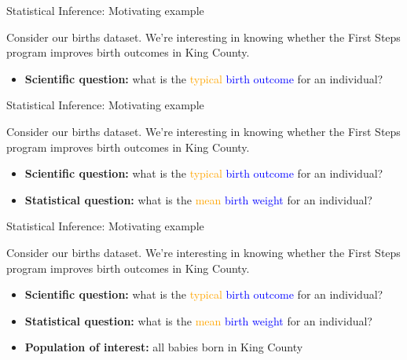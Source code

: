 \documentclass[10pt,t]{beamer}
\begin{document}
\begin{frame}{Statistical Inference: Motivating example}

Consider our births dataset. We're interesting in knowing whether the First Steps program improves birth outcomes in King County.

\vspace{0.1cm}

\begin{itemize}
	\item \textbf{Scientific question:} what is the \textcolor{orange}{typical}  \textcolor{blue}{birth outcome} for an individual?

\end{itemize}

\end{frame}

\begin{frame}{Statistical Inference: Motivating example}

Consider our births dataset. We're interesting in knowing whether the First Steps program improves birth outcomes in King County.

\vspace{0.1cm}

\begin{itemize}
	\item \textbf{Scientific question:} what is the \textcolor{orange}{typical}  \textcolor{blue}{birth outcome} for an individual?
	\item \textbf{Statistical question:} what is the \textcolor{orange}{mean} \textcolor{blue}{birth weight} for an individual?
\end{itemize}

\end{frame}

\begin{frame}{Statistical Inference: Motivating example}

Consider our births dataset. We're interesting in knowing whether the First Steps program improves birth outcomes in King County.

\vspace{0.1cm}

\begin{itemize}
	\item \textbf{Scientific question:} what is the \textcolor{orange}{typical}  \textcolor{blue}{birth outcome} for an individual?
	\item \textbf{Statistical question:} what is the \textcolor{orange}{mean} \textcolor{blue}{birth weight} for an individual?
	\item \textbf{Population of interest:} all babies born in King County
\end{itemize}

\end{frame}
\end{document}
